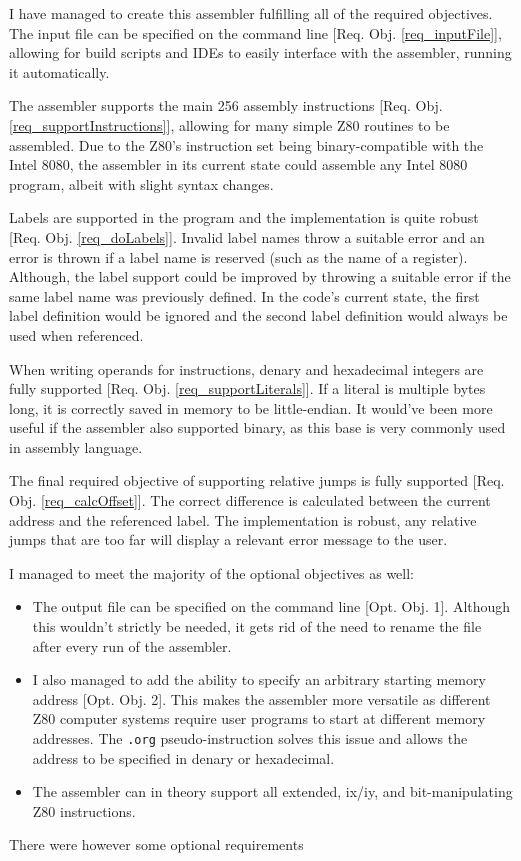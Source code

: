 \documentclass[a4paper]{report}
\begin{document}
I have managed to create this assembler fulfilling all of the required
objectives. The input file can be specified on the command line [Req. Obj.
\ref{req_inputFile}], allowing for build scripts and IDEs to easily interface
with the assembler, running it automatically.

The assembler supports the main 256 assembly instructions [Req. Obj.
\ref{req_supportInstructions}], allowing for many simple Z80 routines to be
assembled. Due to the Z80's instruction set being binary-compatible with the
Intel 8080, the assembler in its current state could assemble any Intel 8080
program, albeit with slight syntax changes.

Labels are supported in the program and the implementation is quite robust
[Req. Obj. \ref{req_doLabels}].
Invalid label names throw a suitable error and an error is thrown if a label
name is reserved (such as the name of a register). Although, the label support
could be improved by throwing a suitable error if the same label name was
previously defined. In the code's current state, the first label definition
would be ignored and the second label definition would always be used when
referenced.

When writing operands for instructions, denary and hexadecimal integers are
fully supported [Req. Obj. \ref{req_supportLiterals}]. If a literal is multiple bytes long,
it is correctly saved in memory to be little-endian. It would've been more
useful if the assembler also supported binary, as this base is very commonly
used in assembly language.

The final required objective of supporting relative jumps is fully supported
[Req. Obj. \ref{req_calcOffset}].
The correct difference is calculated between the current address and the
referenced label. The implementation is robust, any relative jumps that are too
far will display a relevant error message to the user.

\bigskip

I managed to meet the majority of the optional objectives as well:

\begin{itemize}
	\item
The output file can be specified on the command line
[Opt. Obj. 1]. Although this wouldn't
strictly be needed, it gets rid of the need to rename the file after every
run of the assembler.
	\item
I also managed to add the ability to specify an arbitrary starting memory
address [Opt. Obj. 2]. This makes the assembler more versatile as different Z80
computer systems require user programs to start at different memory addresses.
The \texttt{.org} pseudo-instruction solves this issue and allows the
address to be specified in denary or hexadecimal.
	\item
The assembler can in theory support all extended, ix/iy, and bit-manipulating
Z80 instructions. 
\end{itemize}

There were however some optional requirements


\end{document}
